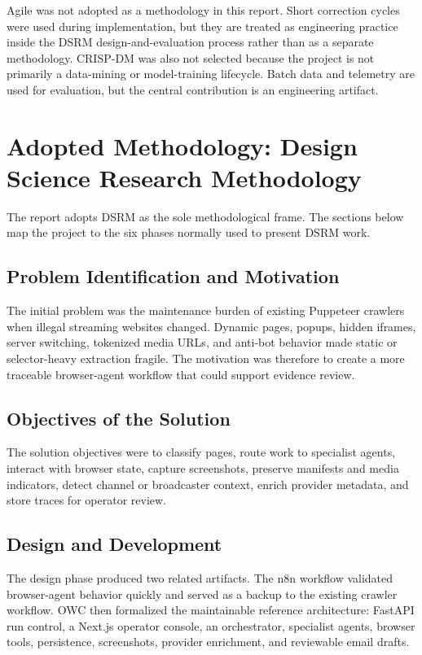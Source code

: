 Agile was not adopted as a methodology in this report. Short correction cycles
were used during implementation, but they are treated as engineering practice
inside the DSRM design-and-evaluation process rather than as a separate
methodology. CRISP-DM was also not selected because the project is not
primarily a data-mining or model-training lifecycle. Batch data and telemetry
are used for evaluation, but the central contribution is an engineering
artifact.



\section{Adopted Methodology: Design Science Research Methodology}

The report adopts DSRM as the sole methodological frame. The sections below map
the project to the six phases normally used to present DSRM work.

\subsection{Problem Identification and Motivation}

The initial problem was the maintenance burden of existing Puppeteer crawlers
when illegal streaming websites changed. Dynamic pages, popups, hidden iframes,
server switching, tokenized media URLs, and anti-bot behavior made static or
selector-heavy extraction fragile. The motivation was therefore to create a
more traceable browser-agent workflow that could support evidence review.

\subsection{Objectives of the Solution}

The solution objectives were to classify pages, route work to specialist
agents, interact with browser state, capture screenshots, preserve manifests
and media indicators, detect channel or broadcaster context, enrich provider
metadata, and store traces for operator review.

\subsection{Design and Development}

The design phase produced two related artifacts. The n8n workflow validated
browser-agent behavior quickly and served as a backup to the existing crawler
workflow. OWC then formalized the maintainable reference architecture: FastAPI
run control, a Next.js operator console, an orchestrator, specialist agents,
browser tools, persistence, screenshots, provider enrichment, and reviewable
email drafts.

